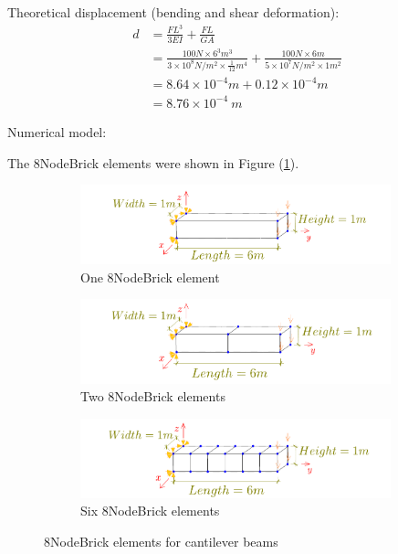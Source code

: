 \documentclass[fleqn,11pt,letter]{article}
\begin{document}
Theoretical displacement (bending and shear deformation):
\begin{equation}
  \begin{aligned}
  d &=\frac{FL^3}{3EI}+\frac{FL}{GA} \\ 
    &= \frac{100 N \times 6^3 m^3}{3\times 10^8 N/m^2 \times \frac{1}{12} m^4}+ 
    \frac{100 N\times 6 m}{5\times 10^7 N/m^2\times 1 m^2} \\ 
    &=8.64\times 10^{-4} m + 0.12 \times 10^{-4} m  \\
   & =8.76\times 10^{-4} \ m
   \end{aligned}
\end{equation}



Numerical model:



The 8NodeBrick elements were shown in Figure (\ref{fig 8NodeBrick elements for cantilever beams}).

\begin{figure}[H]
  \centering
  \begin{subfigure}{0.5\textwidth}
    \centering
    \includegraphics[width=9cm]{../Figure_files/8NodeBrick/beam_8brick_1div.pdf}
    \caption{One 8NodeBrick element}
  \end{subfigure}
  \vskip 8pt
  \begin{subfigure}{0.5\textwidth}
    \centering
    \includegraphics[width=9cm]{../Figure_files/8NodeBrick/beam_8brick_2div.pdf}
    \caption{Two 8NodeBrick elements}
  \end{subfigure}
  \vskip 8pt
  \begin{subfigure}{0.5\textwidth}
    \centering
    \includegraphics[width=9cm]{../Figure_files/8NodeBrick/beam_8brick_6div.pdf}
    \caption{Six 8NodeBrick elements}
  \end{subfigure}
  \captionsetup{justification=centering,margin=3cm}
  \caption{8NodeBrick elements for cantilever beams}
  \label{fig 8NodeBrick elements for cantilever beams}
\end{figure}
\end{document}

